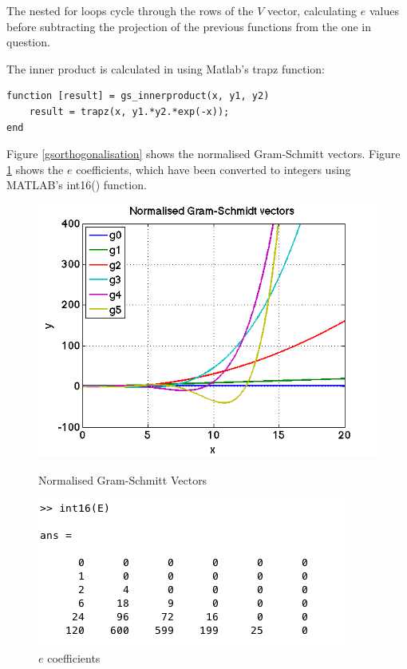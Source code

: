 \documentclass{article}
\begin{document}
The nested for loops cycle through the rows of the $V$ vector, calculating $e$ values before subtracting the projection of the previous functions from the one in question.  


The inner product is calculated in  using Matlab's trapz function:

\begin{lstlisting}
function [result] = gs_innerproduct(x, y1, y2)
    result = trapz(x, y1.*y2.*exp(-x));
end
\end{lstlisting}

Figure \ref{gsorthogonalisation} shows the normalised Gram-Schmitt vectors. Figure \ref{evalues} shows the $e$ coefficients, which have been converted to integers using MATLAB's int16() function. 

\begin{figure}[h]
\centering
	\begin{minipage}[c][][b]{0.45\linewidth}
		\begin{center}
		\includegraphics[scale=0.35]{Matlab/GramSchmidt/Images/gsorthogonalisation.png}  
		\end{center}
		\caption[b]{Normalised Gram-Schmitt Vectors}
		\label{gsorthogonalisation}
	\end{minipage}
\quad\quad\quad\quad
	\begin{minipage}[c][][b]{0.45\linewidth}
		\begin{center}
		\includegraphics[scale=0.6]{Matlab/GramSchmidt/Images/gs_Evalues.png}
		\end{center}
		\caption[b]{$e$ coefficients}
		\label{evalues}
	\end{minipage}

\end{figure}
\end{document}
